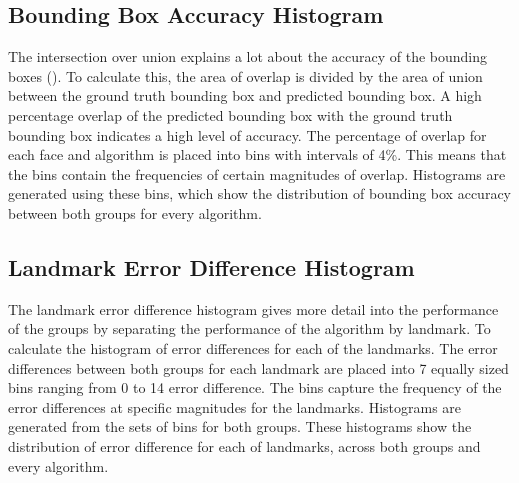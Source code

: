 \documentclass{l4proj}
\begin{document}
\subsection{Bounding Box Accuracy Histogram}
The intersection over union explains a lot about the accuracy of the bounding boxes (\cite{iou}). To calculate this, the area of overlap is divided by the area of union between the ground truth bounding box and predicted bounding box. A high percentage overlap of the predicted bounding box with the ground truth bounding box indicates a high level of accuracy. The percentage of overlap for each face and algorithm is placed into bins with intervals of 4\%. This means that the bins contain the frequencies of certain magnitudes of overlap. Histograms are generated using these bins, which show the distribution of bounding box accuracy between both groups for every algorithm.
\subsection{Landmark Error Difference Histogram}
The landmark error difference histogram gives more detail into the performance of the groups by separating the performance of the algorithm by landmark. To calculate the histogram of error differences for each of the landmarks. The error differences between both groups for each landmark are placed into 7 equally sized bins ranging from 0 to 14 error difference. The bins capture the frequency of the error differences at specific magnitudes for the landmarks. Histograms are generated from the sets of bins for both groups. These histograms show the distribution of error difference for each of landmarks, across both groups and every algorithm. 
\end{document}
